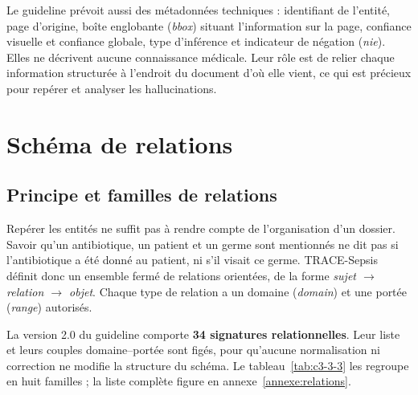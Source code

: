 Le guideline prévoit aussi des métadonnées techniques : identifiant de l’entité, page d’origine, boîte englobante (\emph{bbox}) situant l’information sur la page, confiance visuelle et confiance globale, type d’inférence et indicateur de négation (\emph{nie}). Elles ne décrivent aucune connaissance médicale. Leur rôle est de relier chaque information structurée à l’endroit du document d’où elle vient, ce qui est précieux pour repérer et analyser les hallucinations.

\section{Schéma de relations}\label{sec:c3-3-5}

\subsection{Principe et familles de relations}\label{sec:c3-3-5-1}

Repérer les entités ne suffit pas à rendre compte de l’organisation d’un dossier. Savoir qu’un antibiotique, un patient et un germe sont mentionnés ne dit pas si l’antibiotique a été donné au patient, ni s’il visait ce germe. TRACE-Sepsis définit donc un ensemble fermé de relations orientées, de la forme \emph{sujet $\rightarrow$ relation $\rightarrow$ objet}. Chaque type de relation a un domaine (\emph{domain}) et une portée (\emph{range}) autorisés.

La version 2.0 du guideline comporte \textbf{34 signatures relationnelles}. Leur liste et leurs couples domaine--portée sont figés, pour qu’aucune normalisation ni correction ne modifie la structure du schéma. Le tableau~\ref{tab:c3-3-3} les regroupe en huit familles ; la liste complète figure en annexe~\ref{annexe:relations}.

